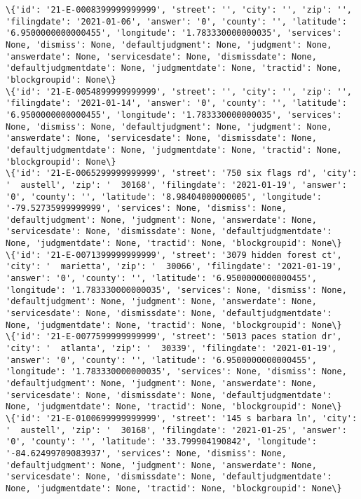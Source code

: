 \documentclass[11pt]{article}
\begin{document}
\begin{Verbatim}[commandchars=\\\{\}]
\{'id': '21-E-0008399999999999', 'street': '', 'city': '', 'zip': '', 'filingdate': '2021-01-06', 'answer': '0', 'county': '', 'latitude': '6.9500000000000455', 'longitude': '1.783330000000035', 'services': None, 'dismiss': None, 'defaultjudgment': None, 'judgment': None, 'answerdate': None, 'servicesdate': None, 'dismissdate': None, 'defaultjudgmentdate': None, 'judgmentdate': None, 'tractid': None, 'blockgroupid': None\}
\{'id': '21-E-0054899999999999', 'street': '', 'city': '', 'zip': '', 'filingdate': '2021-01-14', 'answer': '0', 'county': '', 'latitude': '6.9500000000000455', 'longitude': '1.783330000000035', 'services': None, 'dismiss': None, 'defaultjudgment': None, 'judgment': None, 'answerdate': None, 'servicesdate': None, 'dismissdate': None, 'defaultjudgmentdate': None, 'judgmentdate': None, 'tractid': None, 'blockgroupid': None\}
\{'id': '21-E-0065299999999999', 'street': '750 six flags rd', 'city': '  austell', 'zip': '  30168', 'filingdate': '2021-01-19', 'answer': '0', 'county': '', 'latitude': '8.98404000000005', 'longitude': '-79.52735999999999', 'services': None, 'dismiss': None, 'defaultjudgment': None, 'judgment': None, 'answerdate': None, 'servicesdate': None, 'dismissdate': None, 'defaultjudgmentdate': None, 'judgmentdate': None, 'tractid': None, 'blockgroupid': None\}
\{'id': '21-E-0071399999999999', 'street': '3079 hidden forest ct', 'city': '  marietta', 'zip': '  30066', 'filingdate': '2021-01-19', 'answer': '0', 'county': '', 'latitude': '6.9500000000000455', 'longitude': '1.783330000000035', 'services': None, 'dismiss': None, 'defaultjudgment': None, 'judgment': None, 'answerdate': None, 'servicesdate': None, 'dismissdate': None, 'defaultjudgmentdate': None, 'judgmentdate': None, 'tractid': None, 'blockgroupid': None\}
\{'id': '21-E-0077599999999999', 'street': '5013 paces station dr', 'city': '  atlanta', 'zip': '  30339', 'filingdate': '2021-01-19', 'answer': '0', 'county': '', 'latitude': '6.9500000000000455', 'longitude': '1.783330000000035', 'services': None, 'dismiss': None, 'defaultjudgment': None, 'judgment': None, 'answerdate': None, 'servicesdate': None, 'dismissdate': None, 'defaultjudgmentdate': None, 'judgmentdate': None, 'tractid': None, 'blockgroupid': None\}
\{'id': '21-E-0100699999999999', 'street': '145 s barbara ln', 'city': '  austell', 'zip': '  30168', 'filingdate': '2021-01-25', 'answer': '0', 'county': '', 'latitude': '33.799904190842', 'longitude': '-84.62499709083937', 'services': None, 'dismiss': None, 'defaultjudgment': None, 'judgment': None, 'answerdate': None, 'servicesdate': None, 'dismissdate': None, 'defaultjudgmentdate': None, 'judgmentdate': None, 'tractid': None, 'blockgroupid': None\}

\end{Verbatim}
\end{document}

